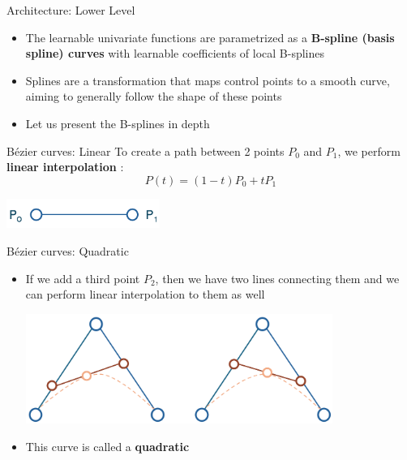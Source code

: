 \begin{frame}{Architecture: Lower Level}
    \begin{itemize}
        \item The learnable univariate functions are parametrized as a \textbf{B-spline (basis spline) curves} with learnable coefficients of local B-splines \vspace{0.3em}
        \item Splines are a transformation that maps control points to a smooth curve, aiming to generally follow the shape of these points \vspace{0.3em}
        \item Let us present the B-splines in depth \vspace{0.3em}
    \end{itemize}
\end{frame}

\begin{frame}{B\'ezier curves: Linear}
        To create a path between 2 points $P_0$ and $P_1$, we perform \textbf{linear interpolation} :
         \vspace{1em}
        $$P(t) = (1-t)P_0 + tP_1$$
        \vspace{0.5em}
        \begin{center}
            \includegraphics[width=5cm]{contents/images/linear_interpolation_1}
        \end{center}
\end{frame}

\begin{frame}{B\'ezier curves: Quadratic}
    \begin{itemize}
        \item If we add a third point $P_2$, then we have two lines connecting them and we can perform linear interpolation to them as well
        \vspace{1em}
        \begin{center}
            \includegraphics[width=10cm]{contents/images/quadratic_bezier_3}
        \end{center}\vspace{1em}
        \item This curve is called a \textbf{quadratic} 
    \end{itemize}
\end{frame}

